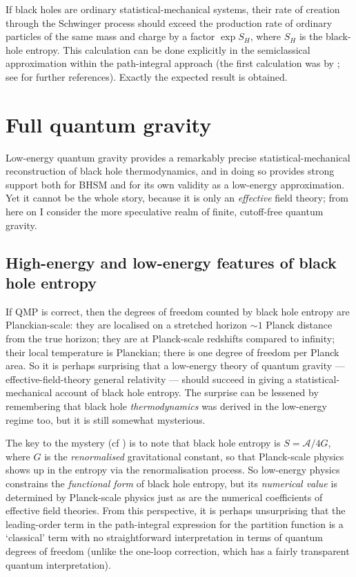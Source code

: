 \documentclass{article}
\newcommand{\mc}[1]{\ensuremath{\mathcal{#1}}}
\begin{document}
If black holes are ordinary statistical-mechanical systems, their rate of creation through the Schwinger process should exceed the production rate of ordinary particles of the same mass and charge by a factor $\exp S_H$, where $S_H$ is the black-hole entropy. This calculation can be done explicitly in the semiclassical approximation within the path-integral approach (the first calculation was by ; see  for further references). Exactly the expected result is obtained.

\section{Full quantum gravity}\label{fullquantumgravity}

Low-energy quantum gravity provides a remarkably precise statistical-mechanical reconstruction of black hole thermodynamics, and in doing so provides strong support both for BHSM and for its own validity as a low-energy approximation. Yet it cannot be the whole story, because it is only an \emph{effective} field theory; from here on I consider the more speculative realm of finite, cutoff-free quantum gravity.

\subsection{High-energy and low-energy features of black hole entropy}\label{high-low}

If QMP is correct, then the degrees of freedom counted by black hole entropy are Planckian-scale: they are localised on a stretched horizon $\sim 1$ Planck distance from the true horizon; they are at Planck-scale redshifts compared to infinity; their local temperature is Planckian; there is one degree of freedom per Planck area. So it is perhaps surprising that a low-energy theory of quantum gravity --- effective-field-theory general relativity --- should succeed in giving a statistical-mechanical account of black hole entropy. The surprise can be lessened by remembering that black hole \emph{thermodynamics} was derived in the low-energy regime too, but it is still somewhat mysterious.

The key to the mystery (cf ) is to note that black hole entropy is $S=\mc{A}/4G$, where $G$ is the \emph{renormalised} gravitational constant, so that Planck-scale physics shows up in the entropy via the renormalisation process. So low-energy physics constrains the \emph{functional form} of black hole entropy, but its \emph{numerical value} is determined by Planck-scale physics just as are the numerical coefficients of effective field theories. From this perspective, it is perhaps unsurprising that the leading-order term in the path-integral expression for the partition function is a `classical' term with no straightforward interpretation in terms of quantum degrees of freedom (unlike the one-loop correction, which has a fairly transparent quantum interpretation). 
\end{document}
